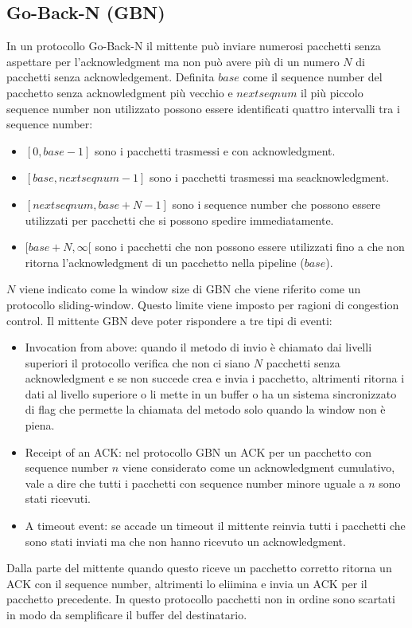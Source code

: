 \subsection{Go-Back-N (GBN)}
In un protocollo Go-Back-N il mittente pu\`o inviare numerosi pacchetti senza aspettare per l'acknowledgment ma non pu\`o avere pi\`u di un numero $N$ di 
pacchetti senza acknowledgement. Definita $base$ come il sequence number del pacchetto senza acknowledgment pi\`u vecchio e $nextseqnum$ il pi\`u piccolo
sequence number non utilizzato possono essere identificati quattro intervalli tra i sequence number:
\begin{itemize}
\item $[0, base-1]$ sono i pacchetti trasmessi e con acknowledgment.
\item $[base, nextseqnum-1]$ sono i pacchetti trasmessi ma seacknowledgment.
\item $[nextseqnum, base+N-1]$ sono i sequence number che possono essere utilizzati per pacchetti che si possono spedire immediatamente.
\item $[base+N, \infty[$ sono i pacchetti che non possono essere utilizzati fino a che non ritorna l'acknowledgment di un pacchetto nella pipeline ($base$).
\end{itemize}
$N$ viene indicato come la window size di GBN che viene riferito come un protocollo sliding-window. Questo limite viene imposto per ragioni di congestion
control. Il mittente GBN deve poter rispondere a tre tipi di eventi:
\begin{itemize}
\item Invocation from above: quando il metodo di invio \`e chiamato dai livelli superiori il protocollo verifica che non ci siano $N$ pacchetti senza 
acknowledgment e se non succede crea e invia i pacchetto, altrimenti ritorna i dati al livello superiore o li mette in un buffer o ha un sistema 
sincronizzato di flag che permette la chiamata del metodo solo quando la window non \`e piena.
\item Receipt of an ACK: nel protocollo GBN un ACK per un pacchetto con sequence number $n$ viene considerato come un acknowledgment cumulativo, vale a dire
che tutti i pacchetti con sequence number minore uguale a $n$ sono stati ricevuti.
\item A timeout event: se accade un timeout il mittente reinvia tutti i pacchetti che sono stati inviati ma che non hanno ricevuto un acknowledgment.
\end{itemize}
Dalla parte del mittente quando questo riceve un pacchetto corretto ritorna un ACK con il sequence number, altrimenti lo eliimina e invia un ACK per il
pacchetto precedente. In questo protocollo pacchetti non in ordine sono scartati in modo da semplificare il buffer del destinatario.
